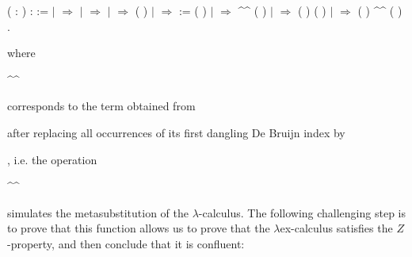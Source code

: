 \documentclass{llncs}
\begin{document}
\begin{coqdoccode}
\coqdocemptyline
\coqdocnoindent
{}  ( : ) :  :=\coqdoceol
\coqdocindent{1.00em}
  \coqdoceol
\coqdocindent{1.00em}
\ensuremath{|}      \ensuremath{\Rightarrow} \coqdoceol
\coqdocindent{1.00em}
\ensuremath{|}      \ensuremath{\Rightarrow} \coqdoceol
\coqdocindent{1.00em}
\ensuremath{|}      \ensuremath{\Rightarrow}  ( )\coqdoceol
\coqdocindent{1.00em}
\ensuremath{|}    \ensuremath{\Rightarrow}   := ( ) \coqdoceol
\coqdocindent{11.00em}
  \coqdoceol
\coqdocindent{11.00em}
\ensuremath{|}   \ensuremath{\Rightarrow}  \^{}\^{} ( )\coqdoceol
\coqdocindent{11.00em}
\ensuremath{|} \coqdocvar{\_} \ensuremath{\Rightarrow}  ( ) ( )\coqdoceol
\coqdocindent{11.00em}
 \coqdoceol
\coqdocindent{1.00em}
\ensuremath{|}    \ensuremath{\Rightarrow} ( ) \^{}\^{} ( )\coqdoceol
\coqdocindent{1.00em}
.\coqdoceol
\end{coqdoccode}

\noindent where \begin{coqdoccode} \^{}\^{} \end{coqdoccode} corresponds to the term obtained from  \begin{coqdoccode}\end{coqdoccode} after replacing all occurrences of its first dangling De Bruijn index by  \begin{coqdoccode}\end{coqdoccode}, i.e. the operation  \begin{coqdoccode}\^{}\^{}\end{coqdoccode} simulates the metasubstitution of the $\lambda$-calculus. The following challenging step is to prove that this function allows us to prove that the  $\lambda$ex-calculus satisfies the $Z$-property, and then conclude that it is confluent:
\end{document}
